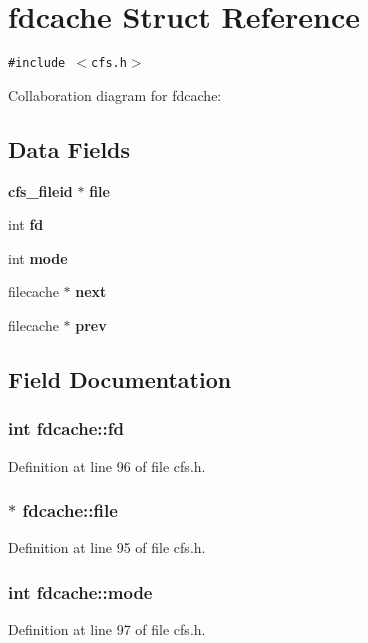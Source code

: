 \section{fdcache Struct Reference}
\label{structfdcache}
{\tt \#include $<$cfs.h$>$}

Collaboration diagram for fdcache:\subsection*{Data Fields}
\begin{CompactItemize}
\item 
{\bf cfs\_\-fileid} $\ast$ {\bf file}
\item 
int {\bf fd}
\item 
int {\bf mode}
\item 
filecache $\ast$ {\bf next}
\item 
filecache $\ast$ {\bf prev}
\end{CompactItemize}


\subsection{Field Documentation}
\subsubsection{\setlength{\rightskip}{0pt plus 5cm}int {\bf fdcache::fd}}\label{structfdcache_o1}




Definition at line 96 of file cfs.h.
\subsubsection{$\ast$ {\bf fdcache::file}}\label{structfdcache_o0}




Definition at line 95 of file cfs.h.
\subsubsection{\setlength{\rightskip}{0pt plus 5cm}int {\bf fdcache::mode}}\label{structfdcache_o2}




Definition at line 97 of file cfs.h.
